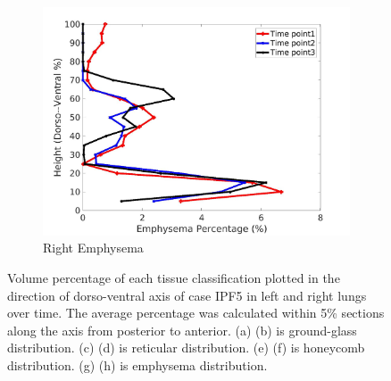 \begin{figure}[H]
\begin{subfigure}{.42\linewidth}
  \includegraphics[width=\linewidth,trim={{.0\wd0} {.0\wd0} {.0\wd0} {.0\wd0}},clip]{Appendix/Image_AppexA/DorsoToVentral/IPF5RightLungEmphysemaDiseaseDorsoToVentral.jpg}
  \caption{Right Emphysema}
  \label{fig:IPF5DiseaseDorsoToVentral-h}
\end{subfigure}
\caption{Volume percentage of each tissue classification plotted in the direction of dorso-ventral axis of case IPF5 in left and right lungs over time. The average percentage was calculated within 5\% sections along the axis from posterior to anterior. (a) (b) is ground-glass distribution. (c) (d) is reticular distribution. (e) (f) is honeycomb distribution. (g) (h) is emphysema distribution.}
\label{fig:IPF5DiseaseDorsoToVentral}
\end{figure}

